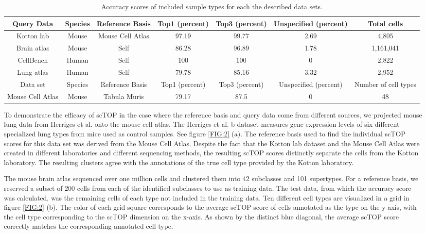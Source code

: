 \documentclass[aps,superscriptaddress, notitlepage,longbibliography]{revtex4-1}
\begin{document}
\begin{table}[h!]
\centering
\begin{tabular}{| c | c | c | c | c | c | c |}
\hline
Query Data & Species & Reference Basis & Top1 (percent) & Top3 (percent) & Unspecified (percent) & Total cells \\ 
\hline
Kotton lab & Mouse & Mouse Cell Atlas & 97.19 & 99.77 & 2.69 & 4,805 \\ 
\hline
Brain atlas & Mouse & Self & 86.28 & 96.89 & 1.78 & 1,161,041 \\
\hline
CellBench & Human & Self & 100 & 100 & 0 & 2,822 \\
\hline
Lung atlas & Human & Self & 79.78 & 85.16 & 3.32 & 2,952 \\  
\hline
\hline
Data set & Species & Reference Basis & Top1 (percent) & Top3 (percent) & Unspecified (percent) & Number of cell types \\
\hline
Mouse Cell Atlas & Mouse & Tabula Muris & 79.17 & 87.5 & 0 & 48 \\
\hline

\end{tabular}
\caption{Accuracy scores of included sample types for each the described data sets.}
\label{table:1}
\end{table}

To demonstrate the efficacy of scTOP in the case where the reference basis and query data come from different sources, we projected mouse lung data from Herriges et al. \cite{herriges_durable_2022} onto the mouse cell atlas. The Herriges et al. b dataset  measures gene expression levels of six different specialized lung types from mice used as control samples. See figure \ref{FIG:2} (a). The reference basis used to find the individual scTOP scores for this data set was derived from the Mouse Cell Atlas. Despite the fact that the Kotton lab dataset and the Mouse Cell Atlas were created in different laboratories and different sequencing methods, the resulting scTOP scores distinctly separate the cells from the Kotton laboratory. The resulting clusters agree with the annotations of the true cell type provided by the Kotton laboratory.

The mouse brain atlas\cite{yao_taxonomy_2021} sequenced over one million cells and clustered them into 42 subclasses and 101 supertypes. For a reference basis, we reserved a subset of 200 cells from each of the identified subclasses to use as training data. The test data, from which the accuracy score was calculated, was the remaining cells of each type not included in the training data. Ten different cell types are visualized in a grid in figure \ref{FIG:2} (b). The color of each grid square corresponds to the average scTOP score of cells annotated as the type on the y-axis, with the cell type corresponding to the scTOP dimension on the x-axis. As shown by the distinct blue diagonal, the average scTOP score correctly matches the corresponding annotated cell type.
\end{document}
